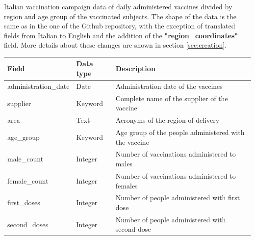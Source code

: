 \documentclass{article}[IEEEtran]
\begin{document}
Italian vaccination campaign data of daily administered vaccines divided by region and age group of the vaccinated subjects. The shape of the data is the same as in the one of the Github repository, with the exception of translated fields from Italian to English and the addition of the \textbf{"region\_coordinates"} field. More details about these changes are shown in section \ref{sec:creation}.

\begin{table}[H]
\centering
\begin{tabular}{@{}lll@{}}
\toprule
\textbf{Field}         & \textbf{Data type} & \textbf{Description}                                                                                               \\ \midrule
administration\_date   & Date               & Administration date of the vaccines                                                                                \\ 
\rule{0pt}{3ex}%
supplier               & Keyword            & Complete name of the supplier of the vaccine                                                                       \\
\rule{0pt}{3ex}%
area                   & Text               & Acronyms of the region of delivery                                                                                 \\
\rule{0pt}{3ex}%
age\_group             & Keyword            & Age group of the people administered with the vaccine                                                              \\
\rule{0pt}{3ex}%
male\_count            & Integer            & Number of vaccinations administered to males                                                                       \\
\rule{0pt}{3ex}%
female\_count          & Integer            & Number of vaccinations administered to females                                                                     \\
\rule{0pt}{3ex}%
first\_doses           & Integer            & Number of people administered with first dose                                                                      \\
\rule{0pt}{3ex}%
second\_doses          & Integer            & Number of people administered with second dose                                                                     \\

\end{tabular}
\end{table}
\end{document}
